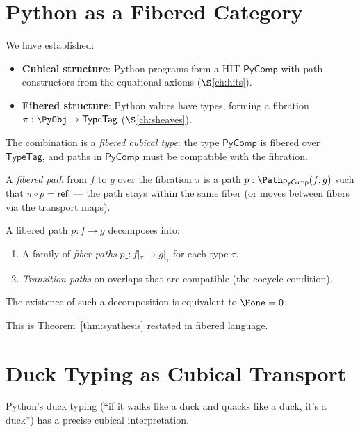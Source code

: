 \section{Python as a Fibered Category}

We have established:
\begin{itemize}
  \item \textbf{Cubical structure}: Python programs form a HIT
    $\mathsf{PyComp}$ with path constructors from the equational
    axioms ($\S$\ref{ch:hits}).
  \item \textbf{Fibered structure}: Python values have types, forming
    a fibration $\pi : \PyObj \to \mathsf{TypeTag}$
    ($\S$\ref{ch:sheaves}).
\end{itemize}

The combination is a \emph{fibered cubical type}: the type
$\mathsf{PyComp}$ is fibered over $\mathsf{TypeTag}$, and paths
in $\mathsf{PyComp}$ must be compatible with the fibration.

\begin{definition}
A \emph{fibered path} from $f$ to $g$ over the fibration $\pi$ is a
path $p : \Path_{\mathsf{PyComp}}(f, g)$ such that
$\pi \circ p = \mathsf{refl}$ --- the path stays within the same
fiber (or moves between fibers via the transport maps).
\end{definition}

\begin{theorem}
A fibered path $p : f \to g$ decomposes into:
\begin{enumerate}
  \item A family of \emph{fiber paths} $p_\tau : f|_\tau \to g|_\tau$
    for each type $\tau$.
  \item \emph{Transition paths} on overlaps that are compatible
    (the cocycle condition).
\end{enumerate}
The existence of such a decomposition is equivalent to $\Hone = 0$.
\end{theorem}

This is Theorem~\ref{thm:synthesis} restated in fibered language.

\section{Duck Typing as Cubical Transport}

Python's duck typing (``if it walks like a duck and quacks like a
duck, it's a duck'') has a precise cubical interpretation.


